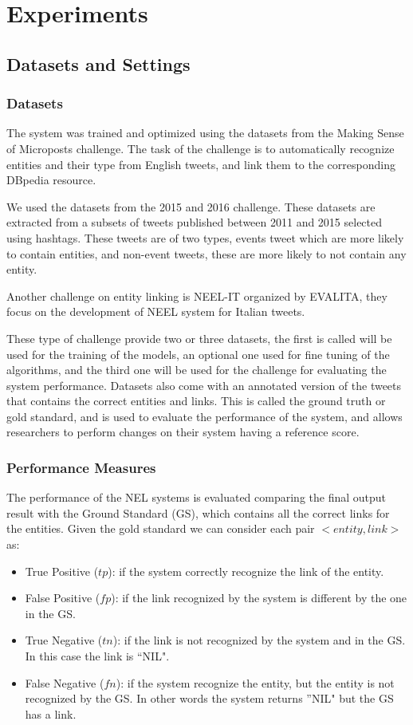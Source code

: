 
\chapter{Experiments}

\section{Datasets and Settings}
\subsection{Datasets}
The system was trained and optimized using the datasets from the Making Sense of Microposts challenge. The task of the challenge is to automatically recognize entities and their type from English tweets, and link them to the corresponding DBpedia resource.  

We used the datasets from the 2015 and 2016 challenge. These datasets are extracted from a subsets of tweets published between 2011 and 2015 selected using hashtags. These tweets are of two types, events tweet which are more likely to contain entities, and non-event tweets, these are more likely to not contain any entity.

Another challenge on entity linking is NEEL-IT organized by EVALITA, they focus on the development of NEEL system for Italian tweets.


These type of challenge provide two or three datasets, the first is called will be used for the training of the  models, an optional one used for fine tuning of the algorithms, and the third one will be used for the challenge for evaluating the system performance. Datasets also come with an annotated version of the tweets that contains the correct entities and links. This is called the ground truth or gold standard, and is used to evaluate the performance of the system, and allows researchers to perform changes on their system having a reference score.

\pagebreak

\subsection{Performance Measures}
The performance of the NEL systems is evaluated comparing the final output result with the Ground Standard (GS), which contains all the correct links for the entities. Given the gold standard we can consider each pair \(<\!entity, link\!>\) as:
\begin{itemize}[itemsep = 0.1em]
\item True Positive (\(tp\)): if the system correctly recognize the link of the entity.
\item False Positive (\(fp\)): if the link recognized by the system is different by the one in the GS.
\item True Negative (\(tn\)): if the link is not recognized by the system and in the GS. In this case the link is ``NIL".
\item False Negative (\(fn\)): if the system recognize the entity, but the entity is not recognized by the GS. In other words the system returns ''NIL" but the GS has a link.
\end{itemize} 

